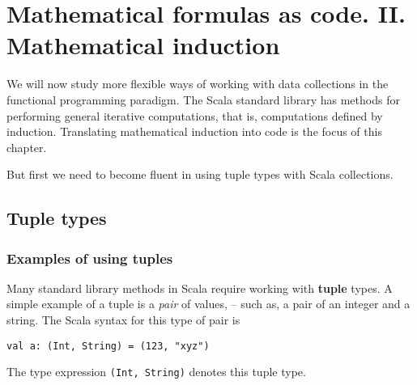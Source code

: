 
\chapter{Mathematical formulas as code. II. Mathematical induction\label{chap:2-Mathematical-induction}}

We will now study more flexible ways of working with data collections
in the functional programming paradigm. The Scala standard library
has methods for performing general iterative computations, that is,
computations defined by induction. Translating mathematical induction
into code is the focus of this chapter.

But first we need to become fluent in using tuple types with Scala
collections.

\section{Tuple types}

\subsection{Examples of using tuples}

Many standard library methods in Scala require working with \textbf{tuple}
types. A simple example of a tuple is a \emph{pair} of values, – such
as, a pair of an integer and a string. The Scala syntax for this type
of pair is
\begin{lstlisting}
val a: (Int, String) = (123, "xyz")
\end{lstlisting}
The type expression \lstinline!(Int, String)!
denotes this tuple type.

